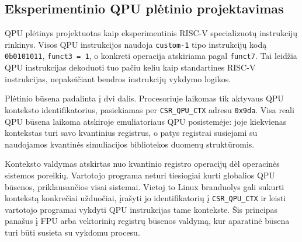 \subsection{Eksperimentinio QPU plėtinio projektavimas}
\label{sec:qpu-pletinio-projektavimas}

QPU plėtinys projektuotas kaip eksperimentinis RISC-V specializuotų instrukcijų rinkinys. Visos QPU instrukcijos naudoja \texttt{custom-1} tipo instrukcijų kodą \texttt{0b0101011}, \texttt{funct3 = 1}, o konkreti operacija atskiriama pagal \texttt{funct7}. Tai leidžia QPU instrukcijas dekoduoti tuo pačiu keliu kaip standartines RISC-V instrukcijas, nepakeičiant bendros instrukcijų vykdymo logikos.

Plėtinio būsena padalinta į dvi dalis. Procesoriuje laikomas tik aktyvaus QPU konteksto identifikatorius, pasiekiamas per \texttt{CSR\_QPU\_CTX} adresu \texttt{0x9da}. Visa reali QPU būsena laikoma atskiroje emuliatoriaus QPU posistemėje: joje kiekvienas kontekstas turi savo kvantinius registrus, o patys registrai susiejami su naudojamos kvantinės simuliacijos bibliotekos duomenų struktūromis.

Konteksto valdymas atskirtas nuo kvantinio registro operacijų dėl operacinės sistemos poreikių. Vartotojo programa neturi tiesiogiai kurti globalios QPU būsenos, priklausančios visai sistemai. Vietoj to Linux branduolys gali sukurti kontekstą konkrečiai užduočiai, įrašyti jo identifikatorių į \texttt{CSR\_QPU\_CTX} ir leisti vartotojo programai vykdyti QPU instrukcijas tame kontekste. Šis principas panašus į FPU arba vektorinių registrų būsenos valdymą, kur aparatinė būsena turi būti susieta su vykdomu procesu.
